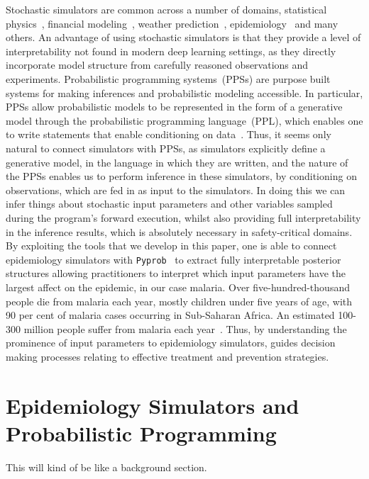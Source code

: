 \documentclass{article}
\begin{document}

Stochastic simulators are common across a number of domains, statistical physics~\cite{landau_binder_2014}, financial modeling~\cite{jackel2002monte},
weather prediction~\cite{evensen1994sequential}, epidemiology~\cite{smith2008towards} and many others. 
An advantage of using stochastic simulators is that they provide a level of interpretability not found in modern deep learning settings, as they directly incorporate model structure from carefully reasoned observations and experiments.  
Probabilistic programming systems~(PPSs) are purpose built systems for making inferences and probabilistic 
modeling accessible. 
In particular, PPSs allow probabilistic models to be represented in the form of a generative model through the
probabilistic programming language~(PPL), which enables one to write statements that enable conditioning on data~\cite{gordon2014probabilistic,Goodman08church:a}. 
Thus, it seems only natural to connect simulators with PPSs, as simulators explicitly define a generative model, in the language in which they are written, and the nature of the PPSs enables us to perform inference in these simulators, by conditioning on observations, which are fed in as input to the simulators. 
In doing this we can infer things about stochastic input parameters and other variables sampled during the program's forward execution, whilst also providing full interpretability in the inference results, which is absolutely necessary in safety-critical domains.
By exploiting the tools that we develop in this paper, one is able to connect epidemiology simulators with \texttt{Pyprob}~\cite{le-2016-inference} to extract fully interpretable posterior structures allowing practitioners to interpret which input parameters have the largest affect on the epidemic, in our case malaria. Over five-hundred-thousand people die from malaria each year, mostly children under five years of age, with 90 per cent of malaria cases occurring in Sub-Saharan Africa. An estimated 100-300 million people suffer from malaria each year~\cite{world2016world}. 
Thus, by understanding the prominence of input parameters to epidemiology simulators, guides decision making processes relating to effective treatment and prevention strategies. 
\label{sec:related}


\section{Epidemiology Simulators and Probabilistic Programming}
\label{sec:background}
This will kind of be like a background section. 
\end{document}

